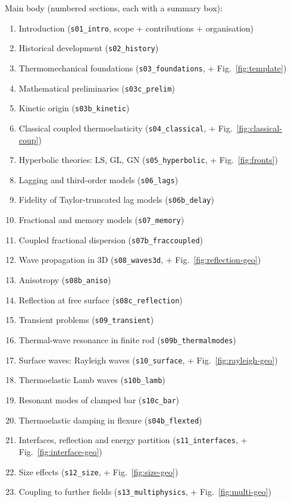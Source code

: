 \documentclass[12pt,a4paper]{article}
\begin{document}
Main body (numbered sections, each with a summary box):
\begin{enumerate}[nosep,leftmargin=1.6em]
\item Introduction ({\tt s01\_intro}, scope + contributions + organisation)
\item Historical development ({\tt s02\_history})
\item Thermomechanical foundations ({\tt s03\_foundations}, + Fig.~\ref*{fig:template})
\item Mathematical preliminaries ({\tt s03c\_prelim})
\item Kinetic origin ({\tt s03b\_kinetic})
\item Classical coupled thermoelasticity ({\tt s04\_classical}, + Fig.~\ref*{fig:classical-coup})
\item Hyperbolic theories: LS, GL, GN ({\tt s05\_hyperbolic}, + Fig.~\ref*{fig:fronts})
\item Lagging and third-order models ({\tt s06\_lags})
\item Fidelity of Taylor-truncated lag models ({\tt s06b\_delay})
\item Fractional and memory models ({\tt s07\_memory})
\item Coupled fractional dispersion ({\tt s07b\_fraccoupled})
\item Wave propagation in 3D ({\tt s08\_waves3d}, + Fig.~\ref*{fig:reflection-geo})
\item Anisotropy ({\tt s08b\_aniso})
\item Reflection at free surface ({\tt s08c\_reflection})
\item Transient problems ({\tt s09\_transient})
\item Thermal-wave resonance in finite rod ({\tt s09b\_thermalmodes})
\item Surface waves: Rayleigh waves ({\tt s10\_surface}, + Fig.~\ref*{fig:rayleigh-geo})
\item Thermoelastic Lamb waves ({\tt s10b\_lamb})
\item Resonant modes of clamped bar ({\tt s10c\_bar})
\item Thermoelastic damping in flexure ({\tt s04b\_flexted})
\item Interfaces, reflection and energy partition ({\tt s11\_interfaces}, + Fig.~\ref*{fig:interface-geo})
\item Size effects ({\tt s12\_size}, + Fig.~\ref*{fig:size-geo})
\item Coupling to further fields ({\tt s13\_multiphysics}, + Fig.~\ref*{fig:multi-geo})

\end{enumerate}
\end{document}
